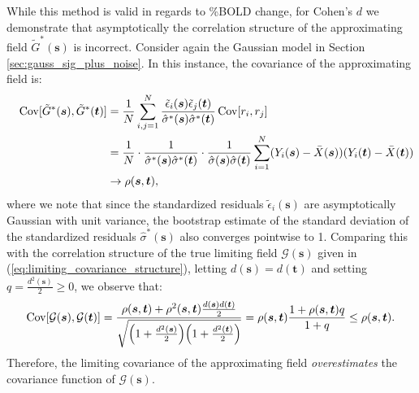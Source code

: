 While this method is valid in regards to \%BOLD change, for Cohen's $d$ we demonstrate that asymptotically the correlation structure of the approximating field $\tilde{G}^*(\bm{s})$ is incorrect. Consider again the Gaussian model in Section \ref{sec:gauss_sig_plus_noise}. In this instance, the covariance of the approximating field is:
\begin{alignat}{4}
\label{eq:approximate_limiting_covariance_structure}
&&\operatorname{\mathrm{Cov}}[\tilde{G}^{*}(\bm{s}),\tilde{G}^{*}(\bm{t})]
&= \frac{1}{N} \sum_{i,j=1}^{N} \frac{\tilde{\epsilon}_{i}(\bm{s})\tilde{\epsilon}_{j}(\bm{t})}{\hat{\sigma}^{*}(\bm{s})\hat{\sigma}^{*}(\bm{t})}\operatorname{\mathrm{Cov}}[r_i,r_j] \notag\\
&
&
&= \frac{1}{N} \cdot \frac{1}{\hat{\sigma}^{*}(\bm{s})\hat{\sigma}^{*}(\bm{t})}\cdot\frac{1}{\hat{\sigma}(\bm{s})\hat{\sigma}(\bm{t})} \sum_{i=1}^{N}(Y_i(\bm{s}) - \bar{X}(\bm{s}))(Y_i(\bm{t}) - \bar{X}(\bm{t})) \notag\\
&
&
&\rightarrow \rho(\bm{s},\bm{t}),
\end{alignat}
where we note that since the standardized residuals $\tilde{\epsilon}_{i}(\bm{s})$ are asymptotically Gaussian with unit variance, the bootstrap estimate of the standard deviation of the standardized residuals $\hat{\sigma}^{*}(\bm{s})$ also converges pointwise to 1. Comparing this with the correlation structure of the true limiting field $\mathcal{G}(\bm{s})$ given in (\ref{eq:limiting_covariance_structure}), letting $d(\bm{s}) = d(\bm{t})$ and setting $q = \frac{d^{2}(\bm{s})}{2} \geq 0$, we observe that:
\begin{equation}
\label{eq:wrong_covariance}
\operatorname{\mathrm{Cov}}[\mathcal{G}(\bm{s}),\mathcal{G}(\bm{t})] = \frac{\rho(\bm{s},\bm{t}) + \rho^{2}(\bm{s},\bm{t})\frac{d({\bm{s}})d({\bm{t}})}{2}}{\sqrt{\Big(1 + \frac{d^{2}({\bm{s}})}{2}\Big)\Big(1 + \frac{d^{2}({\bm{t}})}{2}\Big)}} = \rho(\bm{s},\bm{t}) \frac{1 + \rho(\bm{s},\bm{t})q}{1 + q} \leq \rho(\bm{s},\bm{t}).
\end{equation}
Therefore, the limiting covariance of the approximating field \textit{overestimates} the covariance function of $\mathcal{G}(\bm{s})$. 

